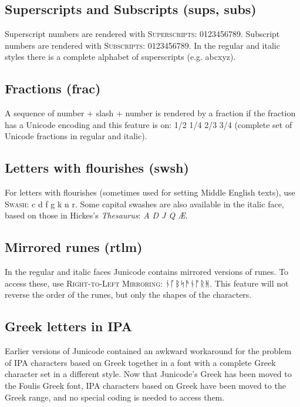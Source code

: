 \documentclass[12pt,a4paper,openany]{book}
\begin{document}
\subsection*{Superscripts and Subscripts (sups, subs)}

\noindent Superscript numbers are rendered with {\scshape Superscripts}:
{ 0123456789}.  Subscript numbers
are rendered with {\scshape Subscripts}:
{ 0123456789}. In the regular and
italic styles there is a complete alphabet of superscripts (e.g.
{abcxyz}).

\subsection*{Fractions (frac)}

A sequence of number + slash + number is rendered by a fraction if the
fraction has a Unicode encoding and this feature is on:
{ 1/2 1/4 2/3 3/4} (complete set of Unicode
fractions in regular and italic).

\subsection*{Letters with flourishes (swsh)}
For letters with flourishes (sometimes used for setting Middle English
texts), use {\scshape Swash}:
{c d f g k n r}. Some capital swashes are also
available in the italic face, based on those in Hickes's \textit{Thesaurus}:
{\textit{A D J Q Æ}}.

\subsection*{Mirrored runes (rtlm)}

In the regular and italic faces Junicode
contains mirrored versions of runes. To access these, use
{\scshape Right-to-Left Mirroring}: {
  ᚾᚪᛒᛋᚫᚾᚩᚱᚻ.} This feature will not reverse the order of the runes,
but only the shapes of the characters.

\subsection*{Greek letters in IPA}

Earlier versions of Junicode contained an awkward workaround for the
problem of IPA characters based on Greek together in a font with a
complete Greek character set in a different style. Now that Junicode's
Greek has been moved to the Foulis Greek font, IPA characters based on
Greek have been moved to the Greek range, and no special coding is
needed to access them.
\end{document}
